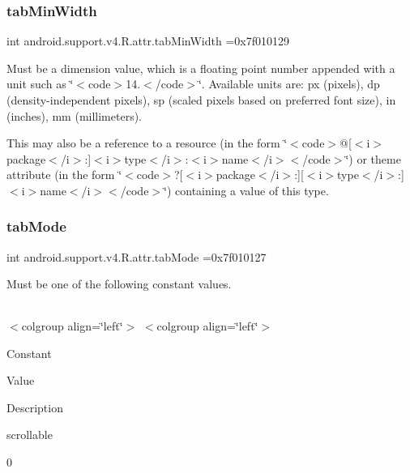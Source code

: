 \subsubsection{\texorpdfstring{tab\+Min\+Width}{tabMinWidth}}
{\footnotesize\ttfamily int android.\+support.\+v4.\+R.\+attr.\+tab\+Min\+Width =0x7f010129\hspace{0.3cm}{\ttfamily [static]}}

Must be a dimension value, which is a floating point number appended with a unit such as \char`\"{}$<$code$>$14.\+5sp$<$/code$>$\char`\"{}. Available units are\+: px (pixels), dp (density-\/independent pixels), sp (scaled pixels based on preferred font size), in (inches), mm (millimeters). 

This may also be a reference to a resource (in the form \char`\"{}$<$code$>$@\mbox{[}$<$i$>$package$<$/i$>$\+:\mbox{]}$<$i$>$type$<$/i$>$\+:$<$i$>$name$<$/i$>$$<$/code$>$\char`\"{}) or theme attribute (in the form \char`\"{}$<$code$>$?\mbox{[}$<$i$>$package$<$/i$>$\+:\mbox{]}\mbox{[}$<$i$>$type$<$/i$>$\+:\mbox{]}$<$i$>$name$<$/i$>$$<$/code$>$\char`\"{}) containing a value of this type. \mbox{\label{classandroid_1_1support_1_1v4_1_1R_1_1attr_a3e4b1597143989d6562d2c5319323044}} 
\subsubsection{\texorpdfstring{tab\+Mode}{tabMode}}
{\footnotesize\ttfamily int android.\+support.\+v4.\+R.\+attr.\+tab\+Mode =0x7f010127\hspace{0.3cm}{\ttfamily [static]}}

Must be one of the following constant values.

\tabulinesep=1mm
\begin{longtabu} spread 0pt [c]{*{0}{|X[-1]}|}
\hline
\end{longtabu}
$<$colgroup align=\char`\"{}left\char`\"{}$>$ $<$colgroup align=\char`\"{}left\char`\"{}$>$ 

Constant

Value

Description 

{\ttfamily scrollable}

0

